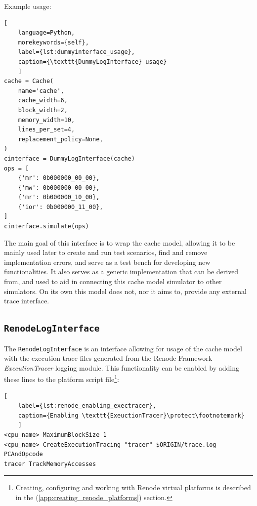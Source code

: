 \noindent Example usage:

\begin{center}
\centering
\begin{minipage}{\linewidth}
\begin{lstlisting}[
    language=Python,
	morekeywords={self},
    label={lst:dummyinterface_usage},
    caption={\texttt{DummyLogInterface} usage}
    ]
cache = Cache(
    name='cache',
    cache_width=6,
    block_width=2,
    memory_width=10,
    lines_per_set=4,
    replacement_policy=None,
)
cinterface = DummyLogInterface(cache)
ops = [
    {'mr': 0b000000_00_00},
    {'mw': 0b000000_00_00},
    {'mr': 0b000000_10_00},
    {'ior': 0b000000_11_00},    
]
cinterface.simulate(ops)
\end{lstlisting}
\end{minipage}
\end{center}

\noindent The main goal of this interface is to wrap the cache model, allowing it to be mainly used later to create and run test scenarios, find and remove implementation errors, and
serve as a test bench for developing new functionalities. It also serves as a generic implementation that can be derived from, and used to aid in connecting this cache model simulator
to other simulators. On its own this model does not, nor it aims to, provide any external trace interface.

\subsection{\texttt{RenodeLogInterface}}

The \texttt{RenodeLogInterface} is an interface allowing for usage of the cache model with the execution trace files generated from the Renode Framework \textit{ExecutionTracer} logging module.
This functionality can be enabled by adding these lines to the platform script file\footnote{Creating, configuring and working with Renode virtual platforms is described in the
(\ref{app:creating_renode_platforms}) section.}:

\begin{center}
\centering
\begin{minipage}{\linewidth}
\begin{lstlisting}[
    label={lst:renode_enabling_exectracer},
    caption={Enabling \texttt{ExeuctionTracer}\protect\footnotemark}
    ]
<cpu_name> MaximumBlockSize 1
<cpu_name> CreateExecutionTracing "tracer" $ORIGIN/trace.log PCAndOpcode
tracer TrackMemoryAccesses
\end{lstlisting}
\end{minipage}
\end{center}

